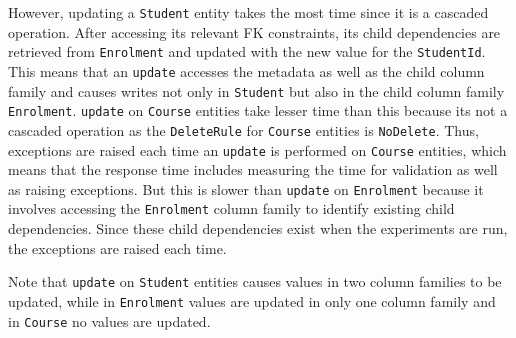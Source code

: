 However, updating a \texttt{Student} entity takes the most time since it is
a cascaded operation. After accessing its relevant \ac{FK} constraints, its
child dependencies are retrieved from \texttt{Enrolment} and updated with the new
value for the \texttt{StudentId}. This means that an \texttt{update}
accesses the metadata as well as the child column family and causes writes not
only in \texttt{Student} but also in the child column family \texttt{Enrolment}.
\texttt{update} on \texttt{Course} entities take lesser time than this because
its not a cascaded operation as the \texttt{DeleteRule} for \texttt{Course}
entities is \texttt{NoDelete}. Thus, exceptions are raised each time an
\texttt{update} is performed on \texttt{Course} entities, which means that the
response time includes measuring the time for validation as well as raising
exceptions. But this is slower than \texttt{update} on \texttt{Enrolment}
because it involves accessing the \texttt{Enrolment} column family
to identify existing child dependencies. Since these child dependencies exist
when the experiments are run, the exceptions are raised each time.

% 
Note that \texttt{update} on \texttt{Student} entities causes values in
two column families to be updated, while in \texttt{Enrolment} values are
updated in only one column family and in \texttt{Course} no values are updated. 


